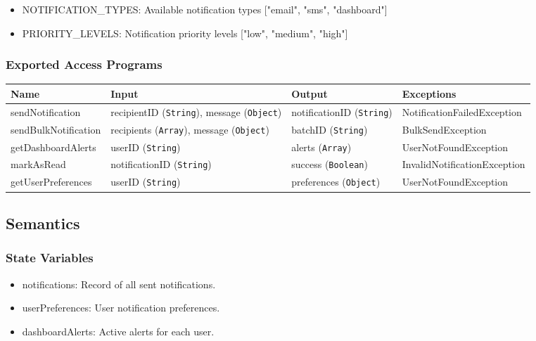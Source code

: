 \documentclass[12pt, titlepage]{article}
\begin{document}
\begin{itemize}
    \item NOTIFICATION\_TYPES: Available notification types ["email", "sms", "dashboard"]
    \item PRIORITY\_LEVELS: Notification priority levels ["low", "medium", "high"]
\end{itemize}


\subsubsection{Exported Access Programs}
\begin{center}
    \scriptsize
    \begin{tabular}{p{2cm} p{4cm} p{4cm} p{2cm}}
        \hline
        \textbf{Name} & \textbf{Input} & \textbf{Output} & \textbf{Exceptions} \\
        \hline
        sendNotification & recipientID (\texttt{String}), message (\texttt{Object}) & notificationID (\texttt{String}) & NotificationFailedException \\
        \hline
        sendBulkNotification & recipients (\texttt{Array}), message (\texttt{Object}) & batchID (\texttt{String}) & BulkSendException \\
        \hline
        getDashboardAlerts & userID (\texttt{String}) & alerts (\texttt{Array}) & UserNotFoundException \\
        \hline
        markAsRead & notificationID (\texttt{String}) & success (\texttt{Boolean}) & InvalidNotificationException \\
        \hline
        getUserPreferences & userID (\texttt{String}) & preferences (\texttt{Object}) & UserNotFoundException \\
        \hline
    \end{tabular}
\end{center}

\subsection{Semantics}
\subsubsection{State Variables}
\begin{itemize}
    \item notifications: Record of all sent notifications.
    \item userPreferences: User notification preferences.
    \item dashboardAlerts: Active alerts for each user.
\end{itemize}
\end{document}
